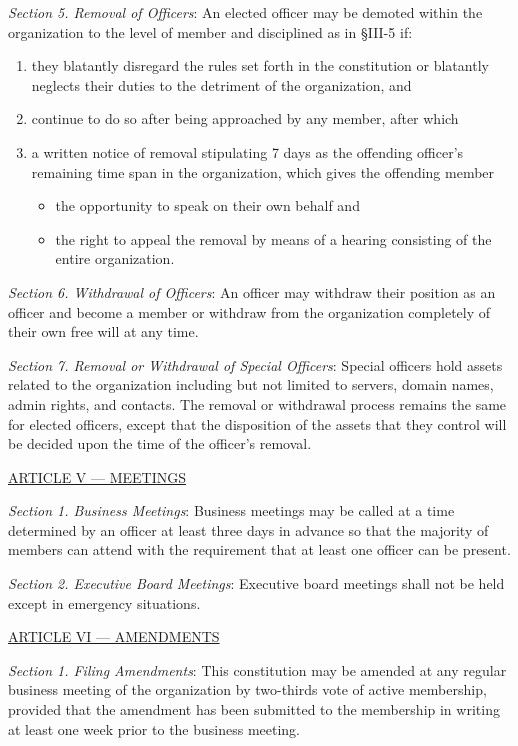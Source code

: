 \documentclass{article}
\begin{document}
\emph{Section 5. Removal of Officers}: An elected officer may be demoted within the organization to the level of member and disciplined as in \S III-5 if:
\begin{enumerate}
  \item they blatantly disregard the rules set forth in the constitution or blatantly neglects their duties to the detriment of the organization, and
  \item continue to do so after being approached by any member, after which
  \item a written notice of removal stipulating 7 days as the offending officer's remaining time span in the organization, which gives the offending member
  \begin{itemize}
    \item the opportunity to speak on their own behalf and
    \item the right to appeal the removal by means of a hearing consisting of the entire organization.
  \end{itemize}
\end{enumerate}

\emph{Section 6. Withdrawal of Officers}: An officer may withdraw their position as an officer and become a member or withdraw from the organization completely of their own free will at any time.

\emph{Section 7. Removal or Withdrawal of Special Officers}: Special officers hold assets related to the organization including but not limited to servers, domain names, admin rights, and contacts.  The removal or withdrawal process remains the same for elected officers, except that the disposition of the assets that they control will be decided upon the time of the officer's removal.

\bigskip

\large{\underline{ARTICLE V --- MEETINGS}}

\emph{Section 1. Business Meetings}: Business meetings may be called at a time determined by an officer at least three days in advance so that the majority of members can attend with the requirement that at least one officer can be present.

\emph{Section 2. Executive Board Meetings}: Executive board meetings shall not be held except in emergency situations.

\bigskip

\large{\underline{ARTICLE VI --- AMENDMENTS}}

\emph{Section 1. Filing Amendments}: This constitution may be amended at any regular business meeting of the organization by two-thirds vote of active membership, provided that the amendment has been submitted to the membership in writing at least one week prior to the business meeting.
\end{document}
